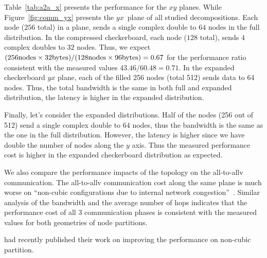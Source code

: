  Table~\ref{tab:a2a_x} presents the \alltoall performance for the $xy$
planes. While  Figure~\ref{fig:comm_yx}  presents the $yx$~plane of all
studied decompositions. Each node ($256$ total) in a plane, sends a single complex double
to $64$ nodes in the full distribution. In the compressed 
checkerboard, each node ($128$ total), sends $4$ complex doubles to
$32$ nodes.  Thus, we expect $(256 {\rm nodes} \times 32 {\rm bytes})/(128 \mbox{nodes} \times 96 \mbox{bytes})=0.67$ 
for the performance ratio consistent with the measured values
$43.46/60.48=0.71$. In the expanded checkerboard $yx$ plane, each of the filled 256 nodes (total 512) sends data to 64
nodes.  Thus, the total bandwidth is the same in both full and expanded distribution, the latency is higher in the expanded distribution. 



Finally, let's consider the expanded distributions.
Half of the nodes (256 out of 512) send a single complex double
to $64$ nodes, thus the bandwidth is the same as the one in the full distribution.
However, the latency is higher since we have double the number of 
nodes along the $y$ axis. Thus the  measured  performance cost is higher 
in the expanded checkerboard distribution as expected. 
 
We also compare the performance impacts of the topology on the
all-to-allv communication. The all-to-allv communication cost along the
same plane is much worse on ``non-cubic configurations due to internal
network congestion''~\cite{Almasi2005}.
Similar analysis of the bandwidth and the average number of hops 
indicates that the  performance cost of all 3 communication 
phases is consistent  with the measured values for both geometries of
node partitions.

 had recently published their work on improving the performance on non-cubic partition.   



